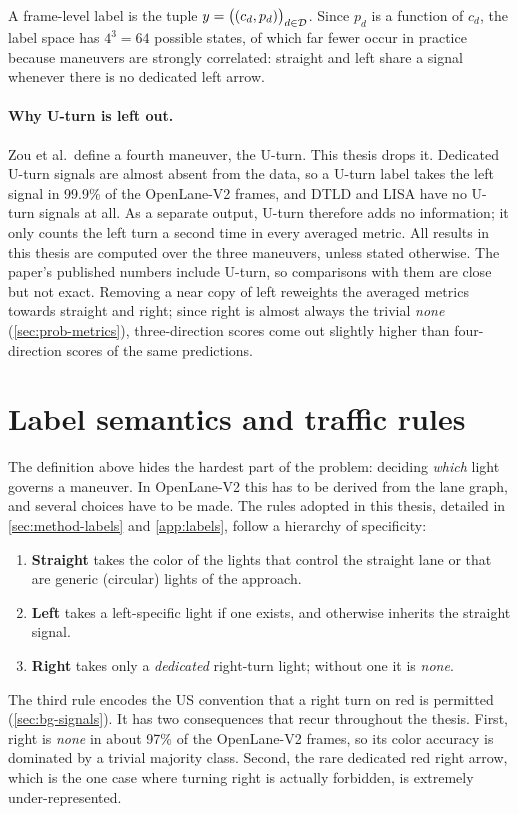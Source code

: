 A frame-level label is the tuple $y = \big((c_d, p_d)\big)_{d\in\mathcal{D}}$. Since $p_d$ is a function of
$c_d$, the label space has $4^3=64$ possible states, of which far fewer occur in practice because
maneuvers are strongly correlated: straight and left share a signal whenever there is no dedicated left
arrow.

\paragraph{Why U-turn is left out.} Zou et al.\ define a fourth maneuver, the U-turn. This thesis drops
it. Dedicated U-turn signals are almost absent from the data, so a U-turn label takes the left signal in
99.9\% of the OpenLane-V2 frames, and DTLD and LISA have no U-turn signals at all. As a separate output,
U-turn therefore adds no information; it only counts the left turn a second time in every averaged
metric. All results in this thesis are computed over the three maneuvers, unless stated otherwise. The
paper's published numbers include U-turn, so comparisons with them are close but not exact. Removing
a near copy of left reweights the averaged metrics towards straight and right; since right is almost
always the trivial \emph{none} (\cref{sec:prob-metrics}), three-direction scores come out slightly
higher than four-direction scores of the same predictions.

\section{Label semantics and traffic rules}
\label{sec:prob-semantics}

The definition above hides the hardest part of the problem: deciding \emph{which} light governs a
maneuver. In OpenLane-V2 this has to be derived from the lane graph, and several choices have to be
made. The rules adopted in this thesis, detailed in \cref{sec:method-labels} and
\cref{app:labels}, follow a hierarchy of specificity:
\begin{enumerate}
  \item \textbf{Straight} takes the color of the lights that control the straight lane or that are
        generic (circular) lights of the approach.
  \item \textbf{Left} takes a left-specific light if one exists, and otherwise inherits the straight
        signal.
  \item \textbf{Right} takes only a \emph{dedicated} right-turn light; without one it is \emph{none}.
\end{enumerate}
The third rule encodes the US convention that a right turn on red is permitted
(\cref{sec:bg-signals}). It has two consequences that recur throughout the thesis. First, right is
\emph{none} in about 97\% of the OpenLane-V2 frames, so its color accuracy is dominated by a trivial
majority class. Second, the rare dedicated red right arrow, which is the one case where turning right
is actually forbidden, is extremely under-represented.

